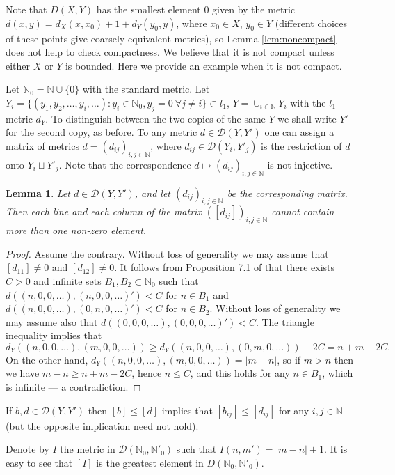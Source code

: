 \documentclass[12pt]{amsart}
\newtheorem{lem}[thm]{Lemma}
\theoremstyle{definition}
\begin{document}
Note that $D(X,Y)$ has the smallest element $0$ given by the metric $d(x,y)=d_X(x,x_0)+1+d_Y(y_0,y)$, where $x_0\in X$, $y_0\in Y$ (different choices of these points give coarsely equivalent metrics), so Lemma \ref{lem:noncompact} does not help to check compactness. We believe that it is not compact unless either $X$ or $Y$ is bounded. Here we provide an example when it is not compact. 

Let $\mathbb N_0=\mathbb N\cup\{0\}$ with the standard metric. 
Let $Y_i=\{(y_1,y_2,\ldots,y_i,\ldots):y_i\in\mathbb N_0, y_j=0 \ \forall j\neq i\}\subset l_1$, $Y=\cup_{i\in\mathbb N}Y_i$ with the $l_1$ metric $d_Y$. To distinguish between the two copies of the same $Y$ we shall write $Y'$ for the second copy, as before.
To any metric $d\in\mathcal D(Y,Y')$ one can assign a matrix of metrics $d=(d_{ij})_{i,j\in\mathbb N}$, where $d_{ij}\in\mathcal D(Y_i,Y'_j)$ is the restriction of $d$ onto $Y_i\sqcup Y'_j$. Note that the correspondence $d\mapsto (d_{ij})_{i,j\in\mathbb N}$ is not injective.

\begin{lem}
Let $d\in\mathcal D(Y,Y')$, and let $(d_{ij})_{i,j\in\mathbb N}$ be the corresponding matrix. Then each line and each column of the matrix $([d_{ij}])_{i,j\in\mathbb N}$ cannot contain more than one non-zero element.

\end{lem}
\begin{proof}
Assume the contrary. Without loss of generality we may assume that $[d_{11}]\neq 0$ and $[d_{12}]\neq 0$. It follows from Proposition 7.1 of \cite{M1} that there exists $C>0$ and infinite sets $B_1,B_2\subset\mathbb N_0$ such that $d((n,0,0,\ldots),(n,0,0,\ldots)')<C$ for $n\in B_1$ and $d((n,0,0,\ldots),(0,n,0,\ldots)')<C$ for $n\in B_2$. Without loss of generality we may assume also that $d((0,0,0,\ldots),(0,0,0,\ldots)')<C$. The triangle inequality implies that 
$$
d_Y((n,0,0,\ldots),(m,0,0,\ldots))\geq d_Y((n,0,0,\ldots),(0,m,0,\ldots))-2C=n+m-2C.
$$
On the other hand, $d_Y((n,0,0,\ldots),(m,0,0,\ldots))=|m-n|$, so if $m>n$ then we have $m-n\geq n+m-2C$, hence $n\leq C$, and this holds for any $n\in B_1$, which is infinite --- a contradiction.
\end{proof}

If $b,d\in\mathcal D(Y,Y')$ then $[b]\leq [d]$ implies that $[b_{ij}]\leq[d_{ij}]$ for any $i,j\in\mathbb N$ (but the opposite implication need not hold).


Denote by $I$ the metric in $\mathcal D(\mathbb N_0,\mathbb N'_0)$ such that $I(n,m')=|m-n|+1$. It is easy to see that $[I]$ is the greatest element in $D(\mathbb N_0,\mathbb N'_0)$.
\end{document}
